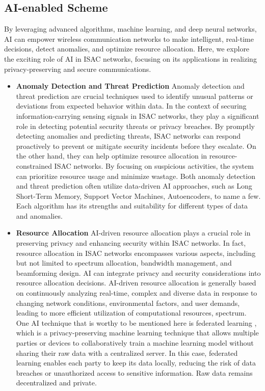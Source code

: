 \documentclass[10pt,journal,twocolumn,twoside]{IEEEtran} %
\begin{document}
\subsection{AI-enabled Scheme}
By leveraging advanced algorithms, machine learning, and deep neural networks, AI can empower wireless communication networks to make intelligent, real-time decisions, detect anomalies, and optimize resource allocation. Here, we explore the exciting role of AI in ISAC networks, focusing on its applications in realizing privacy-preserving and secure communications. 

\begin{itemize}
    \item {\bf Anomaly Detection and Threat Prediction} Anomaly detection and threat prediction are crucial techniques used to identify unusual patterns or deviations from expected behavior within data. In the context of securing information-carrying sensing signals in ISAC networks, they play a significant role in detecting potential security threats or privacy breaches. By promptly detecting anomalies and predicting threats, ISAC networks can respond proactively to prevent or mitigate security incidents before they escalate. On the other hand, they can help optimize resource allocation in resource-constrained ISAC networks. By focusing on suspicious activities, the system can prioritize resource usage and minimize wastage. Both anomaly detection and threat prediction often utilize data-driven AI approaches, such as Long Short-Term Memory, Support Vector Machines, Autoencoders, to name a few. Each algorithm has its strengths and suitability for different types of data and anomalies. 
  \item {\bf Resource Allocation} AI-driven resource allocation plays a crucial role in preserving privacy and enhancing security within ISAC networks. In fact, resource allocation in ISAC networks encompasses various aspects, including but not limited to spectrum allocation, bandwidth management, and beamforming design. 
  AI can integrate privacy and security considerations into resource allocation decisions. AI-driven resource allocation is generally based on continuously analyzing real-time, complex and diverse data in response to changing network conditions, environmental factors, and user demands, leading to more efficient utilization of computational resources, spectrum. One AI technique that is worthy to be mentioned here is federated learning \cite{Shi2022,Anbang2023}, which is a privacy-preserving machine learning technique that allows multiple parties or devices to collaboratively train a machine learning model without sharing their raw data with a centralized server. In this case, federated learning enables each party to keep its data locally, reducing the risk of data breaches or unauthorized access to sensitive information. Raw data remains decentralized and private.

\end{itemize}
\end{document}
